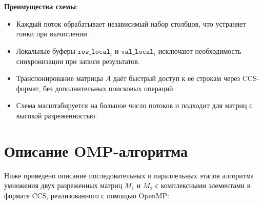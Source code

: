 \documentclass[12pt]{article}
\begin{document}
\newpage
\textbf{Преимущества схемы}:
\begin{itemize}
    \item Каждый поток обрабатывает независимый набор столбцов, что устраняет гонки при вычислении.
    \item Локальные буферы \(\texttt{row\_local}_t\) и \(\texttt{val\_local}_t\) исключают необходимость синхронизации при записи результатов.
    \item Транспонирование матрицы \(A\) даёт быстрый доступ к её строкам через CCS-формат, без дополнительных поисковых операций.
    \item Схема масштабируется на большое число потоков и подходит для матриц с высокой разреженностью.
\end{itemize}

\section{Описание OMP-алгоритма}

Ниже приведено описание последовательных и параллельных этапов алгоритма умножения двух разреженных матриц \(M_1\) и \(M_2\) с комплексными элементами в формате CCS, реализованного с помощью OpenMP:
\end{document}
